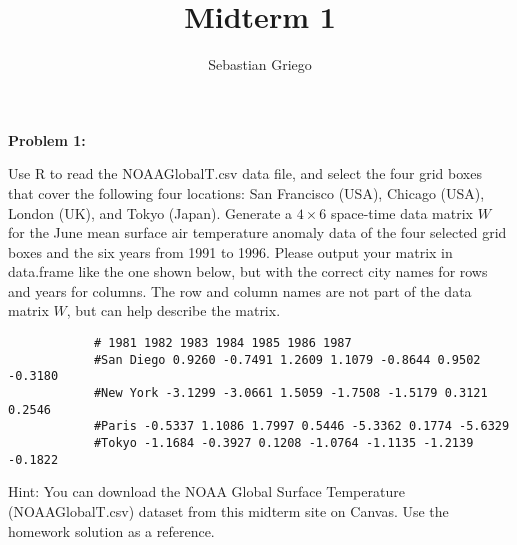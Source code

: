 \documentclass[12pt]{article}
\newenvironment{problem}[1]{
    \textbf{Problem #1:}
}{
    \rmfamily \vspace{2em}
}
\begin{document}
\title{Midterm 1}  %
\author{Sebastian Griego}  %
\maketitle

\begin{problem}{1}
    Use R to read the NOAAGlobalT.csv data file, and select the four grid boxes that cover the following
    four locations: San Francisco (USA), Chicago (USA), London (UK), and Tokyo (Japan). Generate a
    $4 \times 6$ space-time data matrix $W$ for the June mean surface air temperature anomaly data of the four
    selected grid boxes and the six years from 1991 to 1996. Please output your matrix in data.frame
    like the one shown below, but with the correct city names for rows and years for columns. The row and
    column names are not part of the data matrix $W$, but can help describe the matrix.

    \begin{verbatim}
            # 1981 1982 1983 1984 1985 1986 1987
            #San Diego 0.9260 -0.7491 1.2609 1.1079 -0.8644 0.9502 -0.3180
            #New York -3.1299 -3.0661 1.5059 -1.7508 -1.5179 0.3121 0.2546
            #Paris -0.5337 1.1086 1.7997 0.5446 -5.3362 0.1774 -5.6329
            #Tokyo -1.1684 -0.3927 0.1208 -1.0764 -1.1135 -1.2139 -0.1822
    \end{verbatim}
    Hint: You can download the NOAA Global Surface Temperature (NOAAGlobalT.csv) dataset from this
    midterm site on Canvas. Use the homework solution as a reference.
\end{problem}
\end{document}
